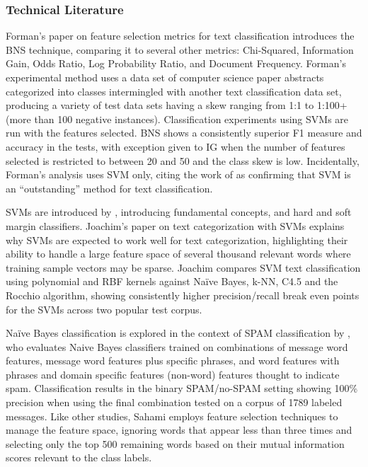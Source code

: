 \documentclass[twoside,11pt]{article}
\begin{document}
\subsubsection{Technical Literature}
Forman's paper on feature selection metrics for text classification \citep{Forman} introduces the BNS technique, comparing it to several other metrics:  Chi-Squared, Information Gain, Odds Ratio,  Log Probability Ratio, and Document Frequency. Forman's experimental method uses a data set of computer science paper abstracts categorized into classes intermingled with another text classification data set, producing a variety of test data sets having a skew ranging from 1:1 to 1:100+ (more than 100 negative instances). Classification experiments using SVMs are run with the features selected. BNS shows a consistently superior F1 measure and accuracy in the tests, with exception given to IG when the number of features selected is restricted to between 20 and 50 and the class skew is low. Incidentally, Forman's analysis uses SVM only, citing the work of \citep{Joachims} as confirming that SVM is an ``outstanding'' method for text classification.
\par SVMs are introduced by \citep{Vapnik}, introducing fundamental concepts, and hard and soft margin classifiers. Joachim's paper on text categorization with SVMs \citep{Joachim} explains why SVMs are expected to work well for text categorization, highlighting their ability to handle a large feature space of several thousand relevant words where training sample vectors may be sparse. Joachim compares SVM text classification using polynomial and RBF kernels against Na\"ive Bayes, k-NN, C4.5 and the Rocchio algorithm, showing consistently higher precision/recall break even points for the SVMs across two popular test corpus.
\par Na\"ive Bayes classification is explored in the context of SPAM classification by \citep{Sahami}, who evaluates Naive Bayes classifiers trained on combinations of message word features, message word features plus specific phrases, and word features with phrases and domain specific features (non-word) features thought to indicate spam. Classification results in the binary SPAM/no-SPAM setting showing 100\% precision when using the final combination tested on a corpus of 1789 labeled messages. Like other studies, Sahami employs feature selection techniques to manage the feature space, ignoring words that appear less than three times and selecting only the top 500 remaining words based on their mutual information scores relevant to the class labels.
\end{document}
